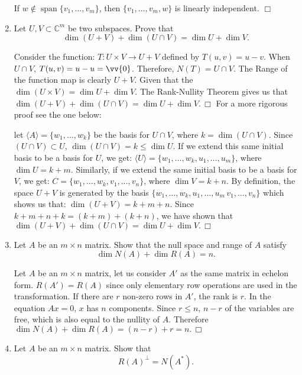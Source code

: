 \documentclass[12pt,letterpaper,reqno]{amsart}
\newcommand{\C}{\mathbb C}
\begin{document}
\begin{enumerate}[1.]
\begin{flushleft}
If $w \not\in \operatorname{span}\{v_1, \ldots, v_m\}$, then $\{v_1, \ldots, v_m, w\}$ is linearly independent. $\Box$
\end{flushleft}
\item Let $U, V\subset \C^m$ be two subspaces. Prove that
$$\dim(U+V)+\dim(U\cap V)=\dim U + \dim V.$$
\begin{flushleft}
Consider the function: $T:U \times V \to U+V$ defined by $T(u,v) = u - v$. When $U \cap V$, $T(u,v) = u -u = \vv{0}$. Therefore, $N(T) = U \cap V$. The Range of the function map is clearly $U + V$. Given that the $\dim (U\times V) = \dim U + \dim V$. The Rank-Nullity Theorem gives us that $\dim(U+V)+\dim(U\cap V)=\dim U + \dim V. \, \Box$ \newline
For a more rigorous proof see the one below:
\end{flushleft}
\begin{flushleft}
let $\langle A\rangle = \{w_1, \ldots, w_k\}$ be the basis for $U \cap V$, where $k = \dim (U \cap V)$. Since $(U \cap V) \subset U$, $\dim (U \cap V) = k \leq \dim U$. If we extend this same initial basis to be a basis for $U$, we get: $\langle U \rangle= \{w_1, \ldots, w_k, u_1, \ldots, u_m\}$, where $\dim U = k + m$. Similarly, if we extend the same initial basis to be a basis for $V$, we get: $C = \{w_1, \ldots, w_k, v_1, \ldots, v_n\}$, where $\dim V = k + n$. \newline
By definition, the space $U + V$ is generated by the basis $\{w_1, \ldots, w_k, u_1, \ldots, u_m\, v_1, \ldots, v_n\}$ which shows us that: $\dim (U + V) = k + m + n$. Since $k + m + n + k = (k + m) + (k + n)$, we have shown that $\dim(U+V)+\dim(U\cap V)=\dim U + \dim V. \, \Box$
\end{flushleft}
\item Let $A$ be an $m\times n$ matrix. Show that the null space and range of $A$ satisfy
$$\dim N(A)+\dim R(A)=n.$$
\begin{flushleft}
Let $A$ be an $m\times n$ matrix, let us consider $A'$ as the same matrix in echelon form. $R(A') = R(A)$ since only elementary row operations are used in the transformation. If there are $r$ non-zero rows in $A'$, the rank is $r$. In the equation $Ax = 0$, $x$ has $n$ components. Since $r \leq n$, $n-r$ of the variables are free, which is also equal to the nullity of $A$. Therefore $\dim N(A)+\dim R(A) = (n-r) + r = n. \, \Box$
\end{flushleft}
\item Let $A$ be an $m\times n$ matrix. Show that 
$$R(A)^\perp =N(A^*).$$

\end{enumerate}
\end{document}
